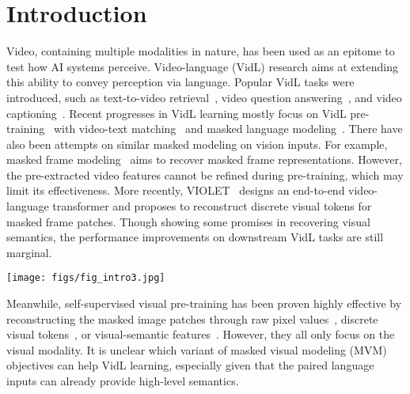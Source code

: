 \documentclass[10pt,twocolumn,letterpaper]{article}
\newcommand{\modelorig}{VIOLET\xspace}
\begin{document}
\section{Introduction}
Video, containing multiple modalities in nature, has been used as an epitome to test how AI systems perceive. Video-language (VidL) research aims at extending this ability to convey perception via language. Popular VidL tasks were introduced, such as text-to-video retrieval~\cite{xu2016msrvtt,krishna2017dense-caption,rohrbach2015lsmdc}, video question answering~\cite{jang2017tgif-qa,xu2017msrvtt-qa}, and video captioning~\cite{xu2016msrvtt,chen2011msvd}. Recent progresses in VidL learning mostly focus on VidL pre-training~\cite{sun2019videobert,miech2019howto100m,zhu2020act-bert} with video-text matching~\cite{li2020hero,zellers2021merlot} and masked language modeling~\cite{devlin2019bert}. 
There have also been attempts on similar masked modeling on vision inputs. For example, masked frame modeling~\cite{li2020hero} aims to recover masked frame representations. However, the pre-extracted video features cannot be refined during pre-training, which may limit its effectiveness. More recently, \modelorig~\cite{fu2021violet} designs an end-to-end video-language transformer and proposes to reconstruct discrete visual tokens for masked frame patches. Though showing some promises in recovering visual semantics, the performance improvements on downstream VidL tasks are still marginal.


\begin{figure*}[t]
\centering
    \texttt{[image: figs/fig\_intro3.jpg]}
    \vspace{0.5ex}
    \caption{We systematically explore \emph{eight} masked visual modeling (MVM) targets for end-to-end video-language (VidL) pre-training, including RGB pixel values (Pixel), histogram of oriented gradients (HOG), depth maps (Depth), optical flow (Flow), discrete visual tokens (VQ), spatial-focused image features (SIF), temporal-aware video features (TVF), and multimodal features from CLIP (MMF). Besides MVM, we pre-train VIOLET model~\cite{fu2021violet} along with video-text matching (VTM) and masked language modeling (MLM).}
    \label{fig:intro}
\end{figure*}









Meanwhile, self-supervised visual pre-training has been proven highly effective by reconstructing the masked image patches through raw pixel values~\cite{he2022mae,xie2022simmim}, discrete visual tokens~\cite{bao2022beit,zhou2022ibot}, or visual-semantic features~\cite{wei2021masked-feat,wei2022mvp}. However, they all only focus on the visual modality. It is unclear which variant of masked visual modeling (MVM) objectives can help VidL learning, especially given that the paired language inputs can already provide high-level semantics.
\end{document}
